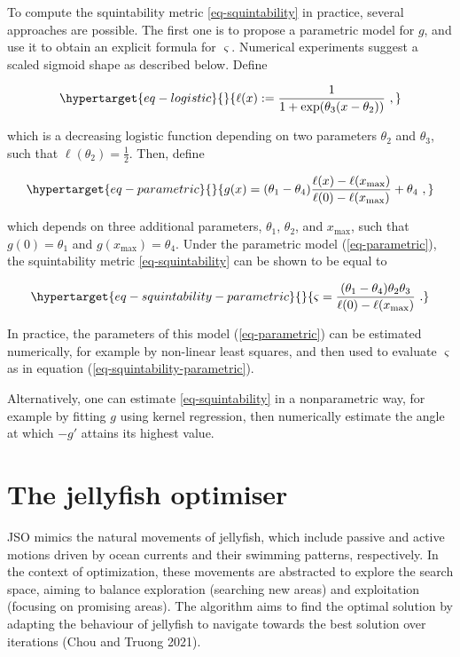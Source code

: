 \documentclass[
  12pt,
]{interact}
\theoremstyle{plain}
\begin{document}
To compute the squintability metric \eqref{eq-squintability} in
practice, several approaches are possible. The first one is to propose a
parametric model for \(g\), and use it to obtain an explicit formula for
\(\varsigma\). Numerical experiments suggest a scaled sigmoid shape as
described below. Define

\begin{equation}\protect\hypertarget{eq-logistic}{}{
\ell(x):=\frac{1}{1+\exp(\theta_{3}(x-\theta_{2}))}\ ,
}\label{eq-logistic}\end{equation}

which is a decreasing logistic function depending on two parameters
\(\theta_2\) and \(\theta_3\), such that
\(\ell(\theta_{2})=\frac{1}{2}\). Then, define

\begin{equation}\protect\hypertarget{eq-parametric}{}{
g(x)=(\theta_{1}-\theta_{4})\frac{\ell(x)-\ell(x_{\max})}{\ell(0)-\ell(x_{\max})}+\theta_{4}\ ,
}\label{eq-parametric}\end{equation}

which depends on three additional parameters, \(\theta_1\),
\(\theta_2\), and \(x_{\max}\), such that \(g(0)=\theta_1\) and
\(g(x_{\max})=\theta_4\). Under the parametric model
(\ref{eq-parametric}), the squintability metric \eqref{eq-squintability}
can be shown to be equal to

\begin{equation}\protect\hypertarget{eq-squintability-parametric}{}{
\varsigma=\frac{(\theta_{1}-\theta_{4})\theta_{2}\theta_{3}}{\ell(0)-\ell(x_{\max})}\ .
}\label{eq-squintability-parametric}\end{equation}

In practice, the parameters of this model (\ref{eq-parametric}) can be
estimated numerically, for example by non-linear least squares, and then
used to evaluate \(\varsigma\) as in equation
(\ref{eq-squintability-parametric}).

Alternatively, one can estimate \eqref{eq-squintability} in a
nonparametric way, for example by fitting \(g\) using kernel regression,
then numerically estimate the angle at which \(-g'\) attains its highest
value.

\hypertarget{sec-JSO}{%
\section{The jellyfish optimiser}\label{sec-JSO}}

JSO mimics the natural movements of jellyfish, which include passive and
active motions driven by ocean currents and their swimming patterns,
respectively. In the context of optimization, these movements are
abstracted to explore the search space, aiming to balance exploration
(searching new areas) and exploitation (focusing on promising areas).
The algorithm aims to find the optimal solution by adapting the
behaviour of jellyfish to navigate towards the best solution over
iterations (Chou and Truong 2021).
\end{document}
